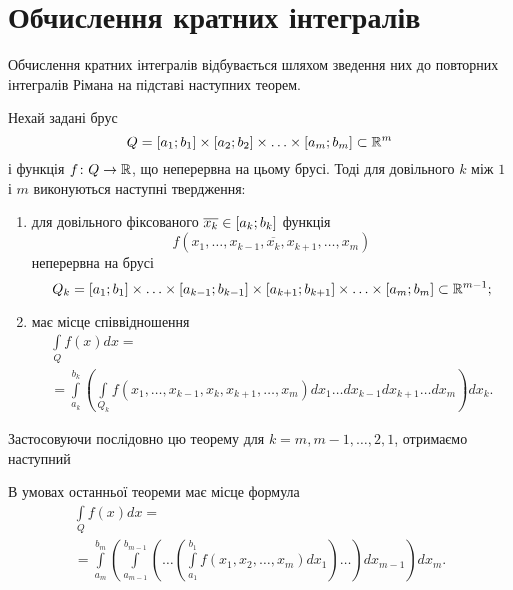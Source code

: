 \section{Обчислення кратних інтегралів}
Обчислення кратних інтегралів відбувається шляхом зведення них до повторних інтегралів Рімана на підставі наступних теорем.
\begin{theorem}
Нехай задані брус
\[
Q = \left[a_1;b_1\right]\times\left[a_2;b_2\right]\times\ldots\times\left[a_m;b_m\right] \subset \mathbb{R}^{m}
\]
і функція $f\colon Q\to \mathbb{R}$, що неперервна на цьому брусі. Тоді для довільного $k$ між $1$ і $m$ виконуються наступні твердження:
\begin{enumerate}[(1)]
\item для довільного фіксованого ${\overline{x_k} \in \left[a_k;b_k\right]}$ функція
\[
f\left(x_1, \ldots, x_{k-1}, \overline{x_k}, x_{k+1}, \ldots, x_m \right)
\]
неперервна на брусі
\[
Q_k = \left[a_1;b_1\right]\times\ldots\times\left[a_{k-1};b_{k-1}\right]\times\left[a_{k+1};b_{k+1}\right]\times\ldots\times\left[a_m;b_m\right] \subset \mathbb{R}^{m-1};
\]
\item має місце співвідношення
\[
\begin{array}{lr}
\int\limits_Q f(x)d x = \\
=\int\limits_{a_k}^{b_k}\left(\int\limits_{Q_k}f\left(x_1, \ldots, x_{k-1}, x_k, x_{k+1}, \ldots, x_m \right)d x_1 \ldots d x_{k-1} d x_{k+1} \ldots d x_m\right)d x_k.
\end{array}
\]
\end{enumerate}
\end{theorem}
Застосовуючи послідовно цю теорему для ${k = m, m - 1, \ldots, 2, 1}$, отримаємо наступний
\begin{corollary}
В умовах останньої теореми має місце формула
\[
\begin{array}{lr}
\int\limits_Q f(x)d x = \\
=\int\limits_{a_{m}}^{b_{m}}\left(
\int\limits_{a_{m-1}}^{b_{m-1}}\left(
\ldots\left(
\int\limits_{a_1}^{b_1}
f\left(x_1, x_2, \ldots, x_m \right)
d x_1 \right)
\ldots\right)
d x_{m-1} \right)
d x_m .
\end{array}
\]
\end{corollary}
